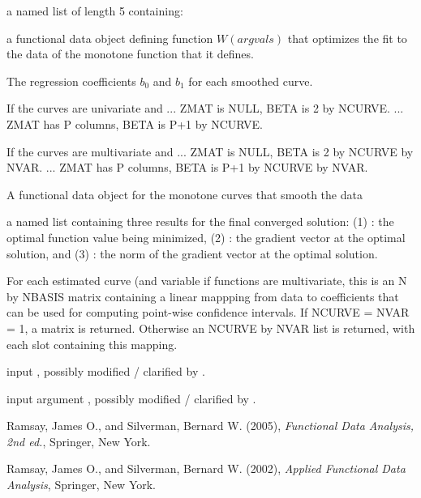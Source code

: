 \begin{Value}
a named list of length 5 containing:

\begin{ldescription}
\item[\code{Wfdobj}] a functional data object defining function $W(argvals)$ that
optimizes the fit to the data of the monotone function that it
defines.

\item[\code{beta}] The regression coefficients $b_0$ and $b_1$ for each smoothed
curve.

If the curves are univariate and
... ZMAT is NULL,       BETA is 2   by NCURVE.
... ZMAT has P columns, BETA is P+1 by NCURVE.

If the curves are multivariate and
... ZMAT is NULL,       BETA is 2   by NCURVE by NVAR.
... ZMAT has P columns, BETA is P+1 by NCURVE by NVAR.

\item[\code{yhatfd}] A functional data object for the monotone curves that smooth the
data

\item[\code{Flist}] a named list containing three results for the final converged
solution:  (1) : the optimal function value being minimized,
(2) : the gradient vector at the optimal solution, and
(3) : the norm of the gradient vector at the optimal
solution.

\item[\code{y2cMap}] For each estimated curve (and variable if functions are
multivariate, this is an N by NBASIS matrix containing a linear
mappping from data to coefficients that can be used for computing
point-wise confidence intervals.  If NCURVE = NVAR = 1, a matrix is
returned.  Otherwise an NCURVE by NVAR list is returned, with each
slot containing this mapping.

\item[\code{argvals}] input , possibly modified / clarified by
.

\item[\code{y}] input argument , possibly modified / clarified by
.

\end{ldescription}
\end{Value}
\begin{References}\relax
Ramsay, James O., and Silverman, Bernard W. (2005), \emph{Functional
Data Analysis, 2nd ed.}, Springer, New York.

Ramsay, James O., and Silverman, Bernard W. (2002), \emph{Applied
Functional Data Analysis}, Springer, New York.
\end{References}
